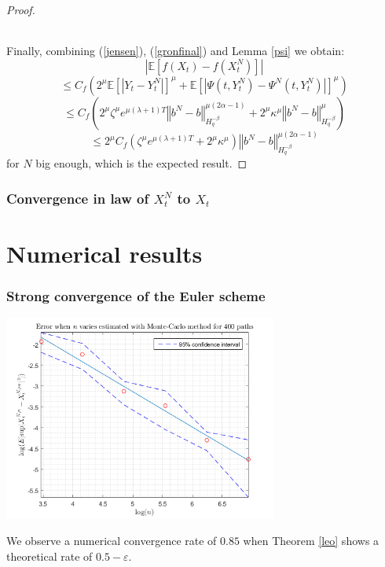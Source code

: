 \documentclass[11pt]{enstaPRE}
\newcommand{\norme}[1]{\left\Vert #1\right\Vert}
\newcommand{\E}{\mathbb{E}}
\begin{document}
\begin{proof}
    \paragraph{}
    Finally, combining (\ref{jensen}), (\ref{gronfinal}) and Lemma \ref{psi} we obtain:    
    \begin{equation*}
    \left|\E\left[f\left(X_t\right)-f\left(X_t^N\right)\right]\right| 
    \end{equation*}
    \begin{equation*}
    \leq C_f  \left(2^\mu\E\left[\left|Y_t-Y_t^N\right|\right]^\mu+\E\left[\left|\Psi\left(t,Y_t^N\right)-\Psi^N\left(t,Y_t^N\right)\right|\right]^\mu\right)
    \end{equation*} 
    \begin{equation*}
    \leq C_f  \left(2^\mu\zeta^\mu e^{\mu(\lambda+1)T} \norme{b^N-b}_{H^{-\beta}_{q}}^{\mu(2\alpha-1)} + 2^\mu \kappa^\mu \norme{b^N-b}_{H^{-\beta}_q}^\mu\right)
    \end{equation*}
    \begin{equation*}
    \leq 2^\mu C_f  \left(\zeta^\mu e^{\mu(\lambda+1)T} + 2^\mu \kappa^\mu\right)\norme{b^N-b}_{H^{-\beta}_{q}}^{\mu(2\alpha-1)}
    \end{equation*}       
    for $N$ big enough, which is the expected result.    
\end{proof}   

\section{Convergence in law of $X^N_t$ to $X_t$}

\part{Numerical results}

\section{Strong convergence of the Euler scheme}

\begin{center}
    \includegraphics[width=9cm]{images/finalerror.png}
\end{center}

We observe a numerical convergence rate of $0.85$ when Theorem \ref{leo} shows a theoretical rate of $0.5-\varepsilon$.



\end{document}

